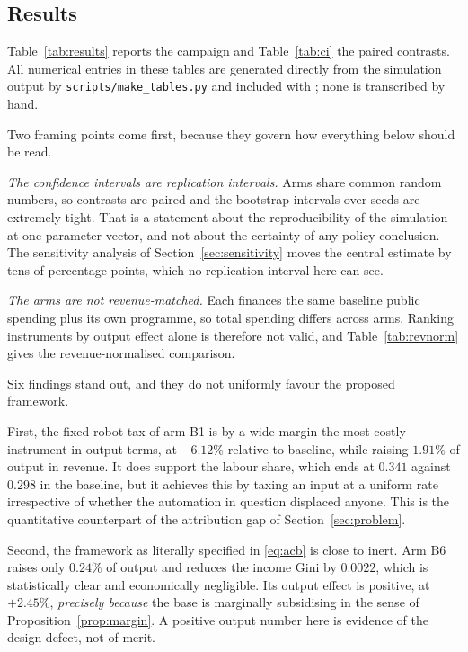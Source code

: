 \documentclass[journal]{IEEEtran}
\theoremstyle{plain}
\theoremstyle{definition}
\begin{document}
\subsection{Results}
\label{sec:results}

Table~\ref{tab:results} reports the campaign and Table~\ref{tab:ci} the paired
contrasts. All numerical entries in these tables are generated directly from the
simulation output by \texttt{scripts/make\_tables.py} and included with
\verb||; none is transcribed by hand.

Two framing points come first, because they govern how everything below should
be read.

\emph{The confidence intervals are replication intervals.} Arms share common
random numbers, so contrasts are paired and the bootstrap intervals over seeds
are extremely tight. That is a statement about the reproducibility of the
simulation at one parameter vector, and not about the certainty of any policy
conclusion. The sensitivity analysis of Section~\ref{sec:sensitivity} moves the
central estimate by tens of percentage points, which no replication interval
here can see.

\emph{The arms are not revenue-matched.} Each finances the same baseline public
spending plus its own programme, so total spending differs across arms. Ranking
instruments by output effect alone is therefore not valid, and
Table~\ref{tab:revnorm} gives the revenue-normalised comparison.

Six findings stand out, and they do not uniformly favour the proposed framework.

First, the fixed robot tax of arm B1 is by a wide margin the most costly
instrument in output terms, at $-6.12\%$ relative to baseline, while raising
$1.91\%$ of output in revenue. It does support the labour share, which ends at
$0.341$ against $0.298$ in the baseline, but it achieves this by taxing an input
at a uniform rate irrespective of whether the automation in question displaced
anyone. This is the quantitative counterpart of the attribution gap of
Section~\ref{sec:problem}.

Second, the framework as literally specified in \eqref{eq:acb} is close to
inert. Arm B6 raises only $0.24\%$ of output and reduces the income Gini by
$0.0022$, which is statistically clear and economically negligible. Its output
effect is positive, at $+2.45\%$, \emph{precisely because} the base is
marginally subsidising in the sense of Proposition~\ref{prop:margin}. A positive
output number here is evidence of the design defect, not of merit.
\end{document}

